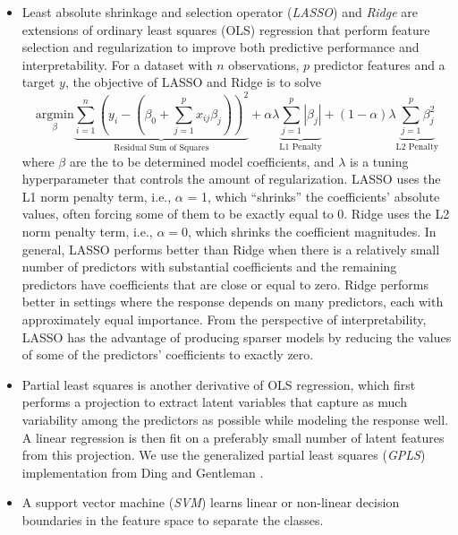 \documentclass[
  oneside]{book}
\providecommand{\tightlist}{%
  \setlength{\itemsep}{0pt}\setlength{\parskip}{0pt}}
\begin{document}
\begin{itemize}
\tightlist
\item
  Least absolute shrinkage and selection operator \autocite{lasso} (\emph{LASSO}) and \emph{Ridge} \autocite{ridge} are extensions of ordinary least squares (OLS) regression that perform feature selection and regularization to improve both predictive performance and interpretability.
  For a dataset with \(n\) observations, \(p\) predictor features and a target \(y\), the objective of LASSO and Ridge is to solve
  \begin{equation}
  \underset{\beta}{\text{argmin}} \underbrace{\sum_{i=1}^n \left( y_i - \left( \beta_0 + \sum_{j=1}^p x_{ij}\beta_j \right) \right)^2}_{\text{Residual Sum of Squares}} + \alpha \lambda \underbrace{\sum_{j=1}^p |\beta_j|}_{\text{L1 Penalty}} + (1-\alpha) \lambda \underbrace{\sum_{j=1}^p \beta_j^2}_{\text{L2 Penalty}}
  \label{eq:regression-with-shrinkage}
  \end{equation}
  where \(\beta\) are the to be determined model coefficients, and \(\lambda\) is a tuning hyperparameter that controls the amount of regularization.
  LASSO uses the L1 norm penalty term, i.e., \(\alpha\) = 1, which ``shrinks'' the coefficients' absolute values, often forcing some of them to be exactly equal to 0.
  Ridge uses the L2 norm penalty term, i.e., \(\alpha = 0\), which shrinks the coefficient magnitudes.
  In general, LASSO performs better than Ridge when there is a relatively small number of predictors with substantial coefficients and the remaining predictors have coefficients that are close or equal to zero.
  Ridge performs better in settings where the response depends on many predictors, each with approximately equal importance.
  From the perspective of interpretability, LASSO has the advantage of producing sparser models by reducing the values of some of the predictors' coefficients to exactly zero.
\item
  Partial least squares is another derivative of OLS regression, which first performs a projection to extract latent variables that capture as much variability among the predictors as possible while modeling the response well.
  A linear regression is then fit on a preferably small number of latent features from this projection.
  We use the generalized partial least squares (\emph{GPLS}) implementation from Ding and Gentleman \autocite{DingEtAl:GPLS2005}.
\item
  A support vector machine (\emph{SVM}) \autocite{Boser:SVM1992} learns linear or non-linear decision boundaries in the feature space to separate the classes.

\end{itemize}
\end{document}
